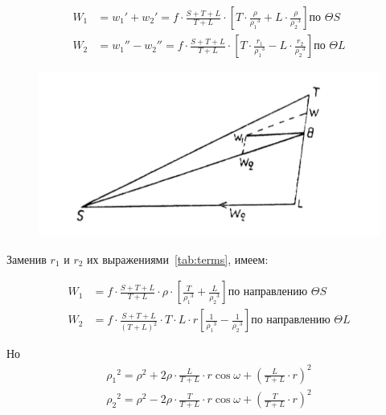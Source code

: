 \documentclass[a4paper,12pt]{article} %
\begin{document}
\begin {equation*}
	\begin {aligned}
		W_1 &=  w _{1}' +  w _{2}' = f\cdot\frac{S+T+L}{T+L}\cdot\left[T\cdot\frac{\rho}{\rho_1{}^3}+L\cdot\frac{\rho}{\rho_2{}^3}\right] \mbox{по }\Theta S \\
		W_2 &=  w _{1}'' -  w _{2}'' = f\cdot\frac{S+T+L}{T+L}\cdot\left[T\cdot\frac{r_{1}}{\rho_1{}^3}-L\cdot\frac{r_{2}}{\rho_2{}^3}\right] \mbox{по }\Theta L
	\end {aligned}
\end {equation*}


\begin{figure}[!h]
	\ffigbox[\FBwidth]{\caption{}\label{pic:third}}
	{ \includegraphics[width=0.8\linewidth]{23} }
\end {figure}


\par{}Заменив $r_1$ и $r_2$ их выражениями~\ref{tab:terms}, имеем:


\begin {align*}
	W_1 &= f\cdot\frac{S+T+L}{T+L}\cdot\rho\cdot\left[\frac{T}{\rho_1{}^3}+\frac{L}{\rho_2{}^3}\right] \mbox{по направлению }\Theta S \\	
	W_2 &=  f\cdot\frac{S+T+L}{\left(T+L\right)^2}\cdot T\cdot L \cdot r \left[\frac{1}{\rho_1{}^3}-\frac{1}{\rho_2{}^3}\right] \mbox{по направлению }\Theta L
\end {align*}

Но
\begin {align*}
	\rho_1{}^2 = \rho^2 + 2\rho\cdot\frac{L}{T+L}\cdot r \cos \omega  + \left(\frac{L}{T+L}\cdot r\right)^2 \\
	\rho_2{}^2 = \rho^2 - 2\rho\cdot\frac{T}{T+L}\cdot r\cos \omega  + \left(\frac{T}{T+L}\cdot r \right)^2
\end {align*}
\end{document}
